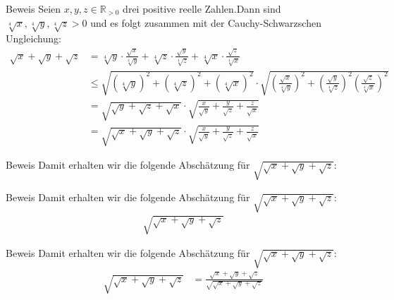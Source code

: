 \documentclass[10pt]{beamer}
\def\bR{\mathbb{R}}
\begin{document}
\begin{frame}{Beweis}
    Seien \( x, y, z \in \bR_{> 0} \) drei positive reelle Zahlen.Dann sind \( \sqrt[4]{x}, \sqrt[4]{y}, \sqrt[4]{z} > 0 \) und es folgt zusammen mit der Cauchy-Schwarzschen Ungleichung:
    \begin{align*}
        \sqrt{x} + \sqrt{y} + \sqrt{z}
        & = \sqrt[4]{y} \cdot \frac{\sqrt{x}}{\sqrt[4]{y}} + \sqrt[4]{z} \cdot \frac{\sqrt{y}}{\sqrt[4]{z}} + \sqrt[4]{x} \cdot \frac{\sqrt{z}}{\sqrt[4]{x}} \\
        & \leq \sqrt{\left( \sqrt[4]{y} \right)^{2} + \left( \sqrt[4]{z} \right)^{2} + \left( \sqrt[4]{x} \right)^{2}} \cdot \sqrt{\left( \frac{\sqrt{x}}{\sqrt[4]{y}} \right)^{2} + \left( \frac{\sqrt{y}}{\sqrt[4]{z}} \right)^{2} \left( \frac{\sqrt{z}}{\sqrt[4]{x}} \right)^{2}} \\
        & = \sqrt{\sqrt{y} + \sqrt{z} + \sqrt{x}} \cdot \sqrt{\frac{x}{\sqrt{y}} + \frac{y}{\sqrt{z}} + \frac{z}{\sqrt{x}}} \\
        & = \sqrt{\sqrt{x} + \sqrt{y} + \sqrt{z}} \cdot \sqrt{\frac{x}{\sqrt{y}} + \frac{y}{\sqrt{z}} + \frac{z}{\sqrt{x}}}
    \end{align*}
\end{frame}


    
\begin{frame}{Beweis}
    Damit erhalten wir die folgende Abschätzung für \( \sqrt{\sqrt{x} + \sqrt{y} + \sqrt{z}} \):
\end{frame}



\begin{frame}{Beweis}
    Damit erhalten wir die folgende Abschätzung für \( \sqrt{\sqrt{x} + \sqrt{y} + \sqrt{z}} \):
    \begin{align*}
        \sqrt{\sqrt{x} + \sqrt{y} + \sqrt{z}}
    \end{align*}
\end{frame}



\begin{frame}{Beweis}
    Damit erhalten wir die folgende Abschätzung für \( \sqrt{\sqrt{x} + \sqrt{y} + \sqrt{z}} \):
    \begin{align*}
        \sqrt{\sqrt{x} + \sqrt{y} + \sqrt{z}}
        & = \frac{ \sqrt{x} + \sqrt{y} + \sqrt{z}}{\sqrt{\sqrt{x} + \sqrt{y} + \sqrt{z}}}
    \end{align*}
\end{frame}
\end{document}
